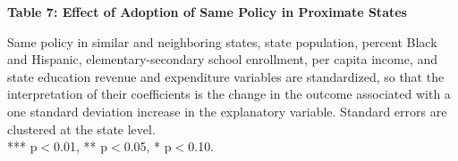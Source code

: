 \documentclass[12pt]{article}
\begin{document}
\begin{table}[h!]
\footnotesize
\captionsetup{justification=centering}
\caption*{\bf Table 7: Effect of Adoption of Same Policy in Proximate States}

\vspace{2mm}
\begin{minipage}{.95\textwidth} 
{\footnotesize Same policy in similar and neighboring states, state population, percent Black and Hispanic, elementary-secondary school enrollment, per capita income, and state education revenue and expenditure variables are standardized, so that the interpretation of their coefficients is the change in the outcome associated with a one standard deviation increase in the explanatory variable. Standard errors are clustered at the state level. \\
 *** p$<$0.01, ** p$<$0.05, * p$<$0.10.}
\end{minipage}
\end{table}
\clearpage
\end{document}
